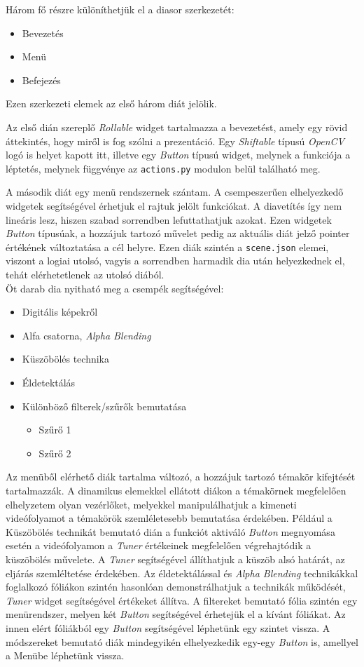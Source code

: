 Három fő részre különíthetjük el a diasor szerkezetét:
\begin{itemize}
	\item Bevezetés
	\item Menü
	\item Befejezés
\end{itemize}
Ezen szerkezeti elemek az első három diát jelölik.

Az első dián szereplő \textit{Rollable} widget tartalmazza a bevezetést, amely egy rövid áttekintés, hogy miről is fog szólni a prezentáció. Egy \textit{Shiftable} típusú \textit{OpenCV} logó is helyet kapott itt, illetve egy \textit{Button} típusú widget, melynek a funkciója a léptetés, melynek függvénye az \texttt{actions.py} modulon belül található meg.

A második diát egy menü rendszernek szántam. A csempeszerűen elhelyezkedő widgetek segítségével érhetjuk el rajtuk jelölt funkciókat. A diavetítés így nem lineáris lesz, hiszen szabad sorrendben lefuttathatjuk azokat. Ezen widgetek \textit{Button} típusúak, a hozzájuk tartozó művelet pedig az aktuális diát jelző pointer értékének változtatása a cél helyre. Ezen diák szintén a \texttt{scene.json} elemei, viszont a logiai utolsó, vagyis a sorrendben harmadik dia után helyezkednek el, tehát elérhetetlenek az utolsó diából.\\
Öt darab dia nyitható meg a csempék segítségével:
\begin{itemize}
	\item Digitális képekről
	\item Alfa csatorna, \textit{Alpha Blending}
	\item Küszöbölés technika
	\item Éldetektálás
	\item Különböző filterek/szűrők bemutatása
	\begin{itemize}
		\item Szűrő 1
		\item Szűrő 2
	\end{itemize}
\end{itemize}
Az menüből elérhető diák tartalma változó, a hozzájuk tartozó témakör kifejtését tartalmazzák. A dinamikus elemekkel ellátott diákon a témakörnek megfelelően elhelyzetem olyan vezérlőket, melyekkel manipulálhatjuk a kimeneti videófolyamot a témakörök szemléletesebb bemutatása érdekében.
Például a Küszöbölés technikát bemutató dián a funkciót aktiváló \textit{Button} megnyomása esetén a videófolyamon a \textit{Tuner} értékeinek megfelelően végrehajtódik a küszöbölés művelete. A \textit{Tuner} segítségével állíthatjuk a küszöb alsó határát, az eljárás szemléltetése érdekében.
Az éldetektálással és \textit{Alpha Blending} technikákkal foglalkozó fóliákon szintén hasonlóan demonstrálhatjuk a technikák működését, \textit{Tuner} widget segítségével értékeket állítva.
A filtereket bemutató fólia szintén egy menürendszer, melyen két \textit{Button} segítségével érhetejük el a kívánt fóliákat. Az innen elért fóliákból egy \textit{Button} segítségével léphetünk egy szintet vissza.
A módszereket bemutató diák mindegyikén elhelyezkedik egy-egy \textit{Button} is, amellyel a Menübe léphetünk vissza.

